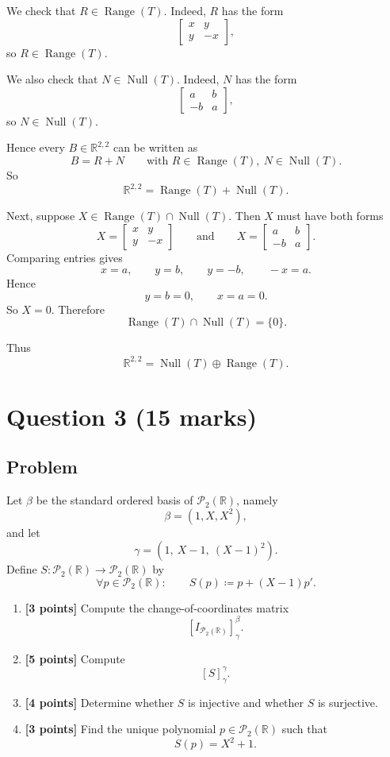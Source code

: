 \documentclass[12pt]{article}
\newcommand{\R}{\mathbb{R}}
\DeclareMathOperator{\Range}{Range}
\DeclareMathOperator{\Null}{Null}
\newcommand{\Ptwo}{\mathcal{P}_2(\R)}
\begin{document}
\begin{enumerate}[label=(\alph*)]
We check that \(R\in \Range(T)\). Indeed, \(R\) has the form
\[
\begin{bmatrix}x&y\\y&-x\end{bmatrix},
\]
so \(R\in \Range(T)\).

We also check that \(N\in \Null(T)\). Indeed, \(N\) has the form
\[
\begin{bmatrix}a&b\\-b&a\end{bmatrix},
\]
so \(N\in \Null(T)\).

Hence every \(B\in \R^{2,2}\) can be written as
\[
B=R+N
\qquad\text{with }R\in \Range(T),\ N\in \Null(T).
\]
So
\[
\R^{2,2}=\Range(T)+\Null(T).
\]

Next, suppose \(X\in \Range(T)\cap \Null(T)\). Then \(X\) must have both forms
\[
X=\begin{bmatrix}x&y\\y&-x\end{bmatrix}
\qquad\text{and}\qquad
X=\begin{bmatrix}a&b\\-b&a\end{bmatrix}.
\]
Comparing entries gives
\[
x=a,\qquad y=b,\qquad y=-b,\qquad -x=a.
\]
Hence
\[
y=b=0,\qquad x=a=0.
\]
So \(X=0\). Therefore
\[
\Range(T)\cap \Null(T)=\{0\}.
\]

Thus
\[
\boxed{\R^{2,2}=\Null(T)\oplus \Range(T).}
\]
\end{enumerate}

\newpage

\section{Question 3 \hfill (15 marks)}

\subsection{Problem}

Let \(\beta\) be the standard ordered basis of \(\Ptwo\), namely
\[
\beta=(1,X,X^2),
\]
and let
\[
\gamma=(1,\ X-1,\ (X-1)^2).
\]
Define \(S:\Ptwo\to \Ptwo\) by
\[
\forall p\in \Ptwo:\qquad S(p)\coloneqq p+(X-1)p'.
\]

\begin{enumerate}[label=(\alph*)]
\item \textbf{[3 points]} Compute the change-of-coordinates matrix
\[
[I_{\Ptwo}]^\beta_\gamma.
\]

\item \textbf{[5 points]} Compute
\[
[S]^\gamma_\gamma.
\]

\item \textbf{[4 points]} Determine whether \(S\) is injective and whether \(S\) is surjective.

\item \textbf{[3 points]} Find the unique polynomial \(p\in \Ptwo\) such that
\[
S(p)=X^2+1.
\]
\end{enumerate}
\end{document}
